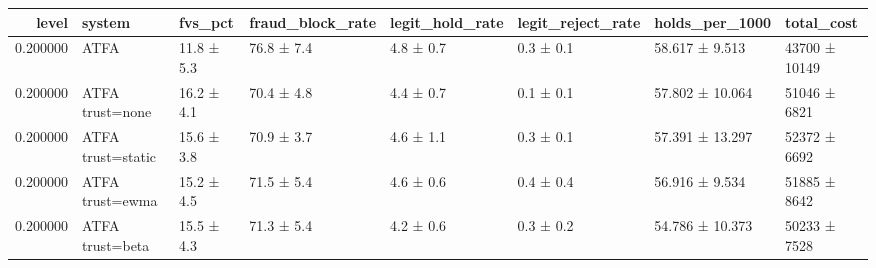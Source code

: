 \begin{tabular}{rlllllll}
\toprule
level & system & fvs\_pct & fraud\_block\_rate & legit\_hold\_rate & legit\_reject\_rate & holds\_per\_1000 & total\_cost \\
\midrule
0.200000 & ATFA & 11.8 ± 5.3 & 76.8 ± 7.4 & 4.8 ± 0.7 & 0.3 ± 0.1 & 58.617 ± 9.513 & 43700 ± 10149 \\
0.200000 & ATFA trust=none & 16.2 ± 4.1 & 70.4 ± 4.8 & 4.4 ± 0.7 & 0.1 ± 0.1 & 57.802 ± 10.064 & 51046 ± 6821 \\
0.200000 & ATFA trust=static & 15.6 ± 3.8 & 70.9 ± 3.7 & 4.6 ± 1.1 & 0.3 ± 0.1 & 57.391 ± 13.297 & 52372 ± 6692 \\
0.200000 & ATFA trust=ewma & 15.2 ± 4.5 & 71.5 ± 5.4 & 4.6 ± 0.6 & 0.4 ± 0.4 & 56.916 ± 9.534 & 51885 ± 8642 \\
0.200000 & ATFA trust=beta & 15.5 ± 4.3 & 71.3 ± 5.4 & 4.2 ± 0.6 & 0.3 ± 0.2 & 54.786 ± 10.373 & 50233 ± 7528 \\
\bottomrule
\end{tabular}
